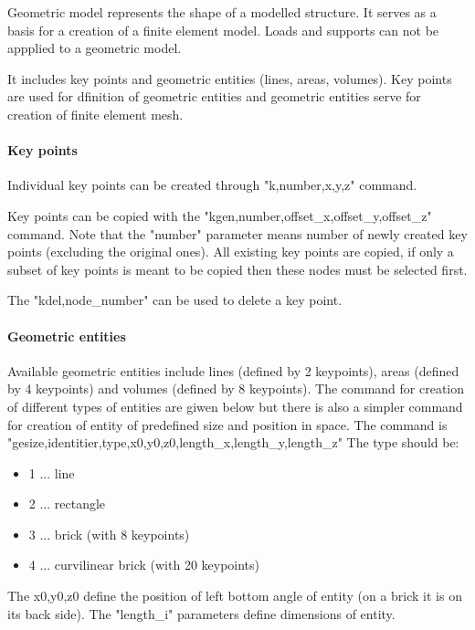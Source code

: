 \documentclass{article}
\begin{document}
 Geometric model represents the shape of a modelled
 structure. It serves as a basis for a creation
 of a finite element model. Loads and supports can not
 be appplied to a geometric model.

 It includes key points and geometric entities (lines,
 areas, volumes). Key points are used for dfinition of
 geometric entities and geometric entities serve for
 creation of finite element mesh.



\paragraph{Key points}

 Individual key points can be created through "k,number,x,y,z"
 command.

 Key points can be copied with the "kgen,number,offset\_x,offset\_y,offset\_z" command.
 Note that the "number" parameter means number of newly created
 key points (excluding the original ones). All existing key points
 are copied, if only a subset of key points is meant to be copied
 then these nodes must be selected first.

 The "kdel,node\_number" can be used to delete a key point.



\paragraph{Geometric entities}

 Available geometric entities include lines (defined by 2 keypoints), areas
 (defined by 4 keypoints) and volumes (defined by 8 keypoints).
 The command for creation of different types of entities are giwen below
 but there is also a simpler command for creation of entity of predefined
 size and position in space.
 The command is "gesize,identitier,type,x0,y0,z0,length\_x,length\_y,length\_z"
 The type should be:


\begin{itemize}
\item  1 ... line
\item  2 ... rectangle
\item  3 ... brick (with 8 keypoints)
\item  4 ... curvilinear brick (with 20 keypoints)
\end{itemize}

 The x0,y0,z0 define the position of left bottom angle of entity (on a brick
 it is on its back side).
 The "length\_i" parameters define dimensions of entity.
\end{document}
